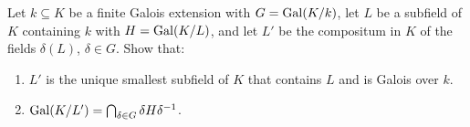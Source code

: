 \begin{problem}
  Let $k\subseteq K$ be a finite Galois extension with $G=\operatorname{Gal}(K/k)$, let $L$
  be a subfield of $K$ containing $k$ with $H=\operatorname{Gal}(K/L)$, and let $L'$ be
  the compositum in $K$ of the fields $\delta(L)$, $\delta\in G$. Show
  that:
\begin{enumerate}[label=(\alph*),noitemsep]
\item $L'$ is the unique smallest subfield of $K$ that contains
  $L$ and is Galois over $k$.
\item $\operatorname{Gal}(K/L')=\bigcap_{\delta\in G}\delta H\delta^{-1}$.
\end{enumerate}
\end{problem}
\begin{solution}
\end{solution}

